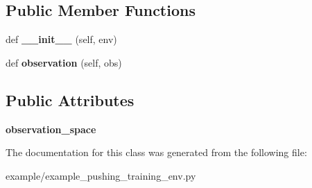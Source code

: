 \subsection*{Public Member Functions}
\begin{DoxyCompactItemize}
\item 
\mbox{\label{classexample__pushing__training__env_1_1FlatObservationWrapper_a6de061353278330c014b51c069c3f49d}} 
def {\bfseries \+\_\+\+\_\+init\+\_\+\+\_\+} (self, env)
\item 
\mbox{\label{classexample__pushing__training__env_1_1FlatObservationWrapper_a7d3d597817e12bfa7eb42c335e6fc65c}} 
def {\bfseries observation} (self, obs)
\end{DoxyCompactItemize}
\subsection*{Public Attributes}
\begin{DoxyCompactItemize}
\item 
\mbox{\label{classexample__pushing__training__env_1_1FlatObservationWrapper_a38c76cd02dbeffe8cbb4808e6f77249a}} 
{\bfseries observation\+\_\+space}
\end{DoxyCompactItemize}


The documentation for this class was generated from the following file\+:\begin{DoxyCompactItemize}
\item 
example/example\+\_\+pushing\+\_\+training\+\_\+env.\+py\end{DoxyCompactItemize}

